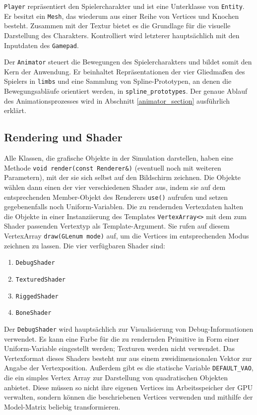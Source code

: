 \lstinline{Player} repräsentiert den Spielercharakter und ist eine Unterklasse von \lstinline{Entity}. Er besitzt ein \lstinline{Mesh}, das wiederum aus einer Reihe von Vertices und Knochen besteht. Zusammen mit der Textur bietet es die Grundlage für die visuelle Darstellung des Charakters. Kontrolliert wird letzterer hauptsächlich mit den Inputdaten des \lstinline{Gamepad}.

Der \lstinline{Animator} steuert die Bewegungen des Spielercharakters und bildet somit den Kern der Anwendung. Er beinhaltet Repräsentationen der vier Gliedmaßen des Spielers in \lstinline{limbs} und eine Sammlung von Spline-Prototypen, an denen die Bewegungsabläufe orientiert werden, in \lstinline{spline_prototypes}. Der genaue Ablauf des Animationsprozesses wird in Abschnitt \ref{animator_section} ausführlich erklärt.


\subsection{Rendering und Shader} \label{rendering_section}
Alle Klassen, die grafische Objekte in der Simulation darstellen, haben eine Methode \lstinline{void render(const Renderer&)} (eventuell noch mit weiteren Parametern), mit der sie sich selbst auf den Bildschirm zeichnen. Die Objekte wählen dann einen der vier verschiedenen Shader aus, indem sie auf dem entsprechenden Member-Objekt des Renderers \lstinline{use()} aufrufen und setzen gegebenenfalls noch Uniform-Variablen. Die zu rendernden Vertexdaten halten die Objekte in einer Instanziierung des Templates \lstinline{VertexArray<>} mit dem zum Shader passenden Vertextyp als Template-Argument. Sie rufen auf diesem VertexArray \lstinline{draw(GLenum mode)} auf, um die Vertices im entsprechenden Modus zeichnen zu lassen. Die vier verfügbaren Shader sind:
\begin{enumerate}
    \item \lstinline{DebugShader}
    \item \lstinline{TexturedShader}
    \item \lstinline{RiggedShader}
    \item \lstinline{BoneShader}
\end{enumerate}

Der \lstinline{DebugShader} wird hauptsächlich zur Visualisierung von Debug-Informationen verwendet. Es kann eine Farbe für die zu rendernden Primitive in Form einer Uniform-Variable eingestellt werden; Texturen werden nicht verwendet. Das Vertexformat dieses Shaders besteht nur aus einem zweidimensionalen Vektor zur Angabe der Vertexposition. Außerdem gibt es die statische Variable \lstinline{DEFAULT_VAO}, die ein simples Vertex Array zur Darstellung von quadratischen Objekten anbietet. Diese müssen so nicht ihre eigenen Vertices im Arbeitsspeicher der GPU verwalten, sondern können die beschriebenen Vertices verwenden und mithilfe der Model-Matrix beliebig transformieren.

